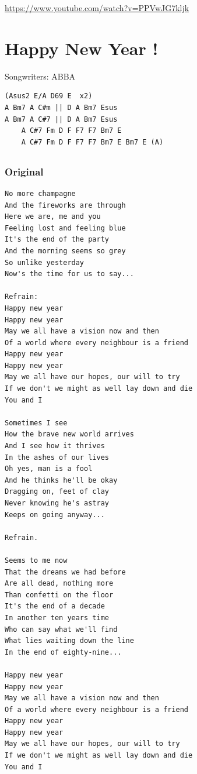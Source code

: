 \documentclass[
]{article}
\begin{document}
\url{https://www.youtube.com/watch?v=PPVwJG7kljk}

\hypertarget{happy-new-year}{%
\section{Happy New Year !}\label{happy-new-year}}

Songwriters: ABBA

\begin{verbatim}
(Asus2 E/A D69 E  x2)
A Bm7 A C#m || D A Bm7 Esus
A Bm7 A C#7 || D A Bm7 Esus
    A C#7 Fm D F F7 F7 Bm7 E
    A C#7 Fm D F F7 F7 Bm7 E Bm7 E (A)
\end{verbatim}

\hypertarget{section-23}{%
\subsection*{}\label{section-23}}

\hypertarget{original-7}{%
\subsubsection*{Original}\label{original-7}}

\begin{verbatim}
No more champagne
And the fireworks are through
Here we are, me and you
Feeling lost and feeling blue
It's the end of the party
And the morning seems so grey
So unlike yesterday
Now's the time for us to say...

Refrain:
Happy new year
Happy new year
May we all have a vision now and then
Of a world where every neighbour is a friend
Happy new year
Happy new year
May we all have our hopes, our will to try
If we don't we might as well lay down and die
You and I

Sometimes I see
How the brave new world arrives
And I see how it thrives
In the ashes of our lives
Oh yes, man is a fool
And he thinks he'll be okay
Dragging on, feet of clay
Never knowing he's astray
Keeps on going anyway...

Refrain.

Seems to me now
That the dreams we had before
Are all dead, nothing more
Than confetti on the floor
It's the end of a decade
In another ten years time
Who can say what we'll find
What lies waiting down the line
In the end of eighty-nine...

Happy new year
Happy new year
May we all have a vision now and then
Of a world where every neighbour is a friend
Happy new year
Happy new year
May we all have our hopes, our will to try
If we don't we might as well lay down and die
You and I
\end{verbatim}
\end{document}
